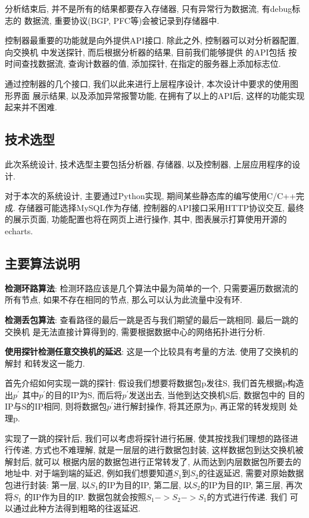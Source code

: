 {\begin{mdframed}[everyline=true]
分析结束后, 并不是所有的结果都要存入存储器, 只有异常行为数据流,
有debug标志的 数据流, 重要协议(BGP, PFC等)会被记录到存储器中.

控制器最重要的功能就是向外提供API接口. 除此之外, 控制器可以对分析器配置,
向交换机 中发送探针, 而后根据分析器的结果, 目前我们能够提供 的API包括
按时间查找数据流, 查询计数器的值, 添加探针, 在指定的服务器上添加标志位.

通过控制器的几个接口, 我们以此来进行上层程序设计,
本次设计中要求的使用图形界面 展示结果, 以及添加异常报警功能,
在拥有了以上的API后, 这样的功能实现起来并不困难.

\subsection{技术选型}

此次系统设计, 技术选型主要包括分析器, 存储器, 以及控制器,
上层应用程序的设计.

对于本次的系统设计, 主要通过Python实现,
期间某些静态库的编写使用C/C++完成. 存储器可能选择MySQL作为存储,
控制器的API接口采用HTTP协议交互, 最终的展示页面,
功能配置也将在网页上进行操作, 其中, 图表展示打算使用开源的echarts.

\subsection{主要算法说明}

\textbf{检测环路算法}: 检测环路应该是几个算法中最为简单的一个,
只需要遍历数据流的所有节点, 如果不存在相同的节点,
那么可以认为此流量中没有环.

\textbf{检测丢包算法}: 查看路径的最后一跳是否与我们期望的最后一跳相同.
最后一跳的交换机 是无法直接计算得到的,
需要根据数据中心的网络拓扑进行分析.

\textbf{使用探针检测任意交换机的延迟}: 这是一个比较具有考量的方法.
使用了交换机的解封 和转发这一能力.

首先介绍如何实现一跳的探针: 假设我们想要将数据包p发往S,
我们首先根据p构造出\(p^{'}\) 其中\(p^{'}\)的目的IP为S,
而后将\(p^{'}\)发送出去, 当他到达交换机S后, 数据包中的
目的IP与S的IP相同, 则将数据包\(p^{'}\)进行解封操作, 将其还原为p,
再正常的转发规则 处理p.

实现了一跳的探针后, 我们可以考虑将探针进行拓展,
使其按找我们理想的路径进行传递, 方式也不难理解,
就是一层层的进行数据包封装, 这样数据包到达交换机被解封后, 就可以
根据内层的数据包进行正常转发了, 从而达到内层数据包所要去的地址中.
对于端到端的延迟, 例如我们想要知道\(S_{1}\)到\(S_{2}\)的往返延迟,
需要对原始数据包进行封装: 第一层, 以\(S_{1}\)的IP为目的IP, 第二层,
以\(S_{2}\)的IP为目的IP, 第三层, 再次将\(S_{1}\) 的IP作为目的IP.
数据包就会按照\(S_{1} -> S_{2} -> S_{1}\)的方式进行传递. 我们
可以通过此种方法得到粗略的往返延迟.


\end{mdframed}}
